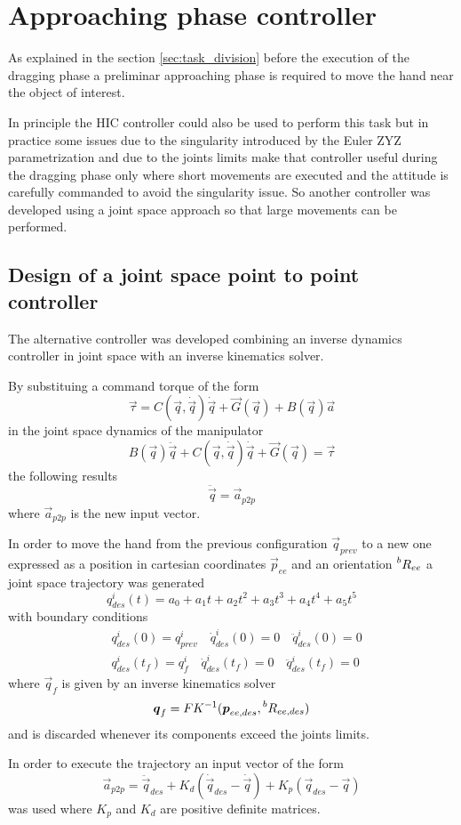 \section{Approaching phase controller}
As explained in the section \ref{sec:task_division} before the execution of the dragging phase
a preliminar approaching phase is required  to move the hand near the object of interest.
\par
In principle the HIC controller could also be used to perform this task but in practice
some issues due to the singularity introduced by the Euler ZYZ parametrization and due to the
joints limits make that controller useful during the dragging phase only where short movements are executed
and the attitude is carefully commanded to avoid the singularity issue.
So another controller was developed using a joint space approach so that large movements can be performed.

\subsection{Design of a joint space point to point controller}
The alternative controller was developed combining an inverse dynamics controller in joint
space with an inverse kinematics solver.
\par
By substituing a command torque of the form
\[
\vec{\tau} = C(\vec{q}, \dot{\vec{q}}) \dot{\vec{q}} + \vec{G}(\vec{q}) + B(\vec{q}) \vec{a}
\]
in the joint space dynamics of the manipulator
\[
  B(\vec{q})\ddot{\vec{q}} + C(\vec{q}, \dot{\vec{q}}) \dot{\vec{q}} + \vec{G}(\vec{q}) = \vec{\tau}
\]
the following results
\[
\ddot{\vec{q}} = \vec{a}_{p2p}
\]
where $\vec{a}_{p2p}$ is the new input vector.
\par
In order to move the hand from the previous configuration $\vec{q}_{prev}$
to a new one expressed as a position in cartesian coordinates $\vec{p}_{ee}$ and
an orientation $\prescript{b}{}{R}_{ee}$ a joint space trajectory was generated
\[
q_{des}^{i}(t) = a_0 + a_1 t + a_2 t^2 + a_3 t^3 + a_4 t^4 + a_5 t^5
\]
with boundary conditions
\[
\begin{split}
  &q_{des}^{i}(0) = q_{prev}^{i} \quad \dot{q}_{des}^{i}(0) = 0 \quad \ddot{q}_{des}^{i}(0) = 0\\
  &q_{des}^{i}(t_f) = q_{f}^{i} \quad \dot{q}_{des}^{i}(t_f) = 0 \quad \ddot{q}_{des}^{i}(t_f) = 0
\end{split}
\]
where $\vec{q}_{f}$ is given by an inverse kinematics solver
\[
\vec{q}_{f} = FK^{-1}(\vec{p}_{ee,des},\prescript{b}{}{R}_{ee,des})
\]
and is discarded whenever its components exceed the joints limits.
\par
In order to execute the trajectory an input vector of the form
\[
\vec{a}_{p2p} = \ddot{\vec{q}}_{des} + K_d(\dot{\vec{q}}_{des} - \dot{\vec{q}}) + K_p(\vec{q}_{des} - \vec{q})
\]
was used where $K_p$ and $K_d$ are positive definite matrices.
\newpage
